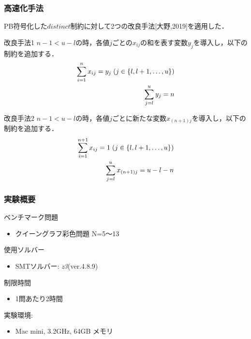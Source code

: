 \documentclass [dvipdfmx,12pt]{beamer}
\newcommand{\distinct}{$distinct$}
\begin{document}

\begin{frame}\footnotesize
    \frametitle{高速化手法}
    PB符号化した\distinct 制約に対して2つの改良手法[大野,2019]を適用した．
    \begin{exampleblock}{改良手法1}
        $n-1 < u-l$の時，各値$j$ごとの$x_{ij}$の和を表す変数$y_{j}$を導入し，以下の制約を追加する．
        \vspace{-3mm}
        \begin{eqnarray}
            \sum_{i=1}^{n} x_{ij}=y_j \; (j \in \{l,l+1, \ldots,u\})\\
            \vspace{-3mm}
            \sum_{j=l}^{u} y_j = n
        \end{eqnarray}
    \end{exampleblock}
    \vspace{-3mm}
    \begin{exampleblock}{改良手法2}
        $n-1 < u-l$の時，各値$j$ごとに新たな変数$x_{(n+1)j}$を導入し，以下の制約を追加する．
        \vspace{-3mm}
        \begin{eqnarray}
            \sum_{i=1}^{n+1} x_{ij}=1 \; (j \in \{l,l+1, \ldots,u\})\\
            \vspace{-3mm}
            \sum_{j=l}^{u} x_{(n+1)j} = u-l-n
        \end{eqnarray}
    \end{exampleblock}
\end{frame}


\begin{frame}
    \frametitle{実験概要}
    ベンチマーク問題
    \begin{itemize}
        \item クイーングラフ彩色問題 N=5〜13
    \end{itemize}
    使用ソルバー
    \begin{itemize}
        \item SMTソルバー: \textit{z3}(ver.4.8.9)
    \end{itemize}
    制限時間
    \begin{itemize}
        \item 1問あたり2時間
    \end{itemize}
    実験環境:
    \begin{itemize}
        \item Mac mini,  3.2GHz,  64GB メモリ
    \end{itemize}
\end{frame}
\end{document}
